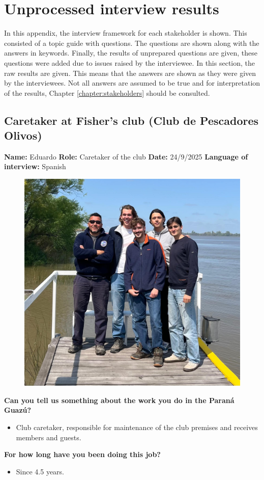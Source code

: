 \chapter{Unprocessed interview results}
\label{chap:interviews}
In this appendix, the interview framework for each stakeholder is shown. This consisted of a topic guide with questions. The questions are shown along with the answers in keywords. Finally, the results of unprepared questions are given, these questions were added due to issues raised by the interviewee. In this section, the raw results are given. This means that the answers are shown as they were given by the interviewees. Not all answers are assumed to be true and for interpretation of the results, Chapter \ref{chapter:stakeholders} should be consulted.

\section{Caretaker at Fisher's club (Club de Pescadores Olivos)}
\textbf{Name:} Eduardo \newline
\textbf{Role:} Caretaker of the club \newline
\textbf{Date:} 24/9/2025 \newline
\textbf{Language of interview:} Spanish

\begin{figure}[H]
    \centering
    \includegraphics[width=0.4\linewidth]{figures/appendixE/InterviewFisher.jpeg}
\end{figure}

\textbf{Can you tell us something about the work you do in the Paraná Guazú?}
\begin{itemize}
    \item Club caretaker, responsible for maintenance of the club premises and receives members and guests.
\end{itemize}

\textbf{For how long have you been doing this job?}
\begin{itemize}
    \item Since 4.5 years.
\end{itemize}

